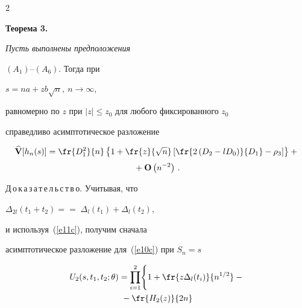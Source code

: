 \begin{multicols}{2}
\noindent


{\bf Теорема 3.} {\it  Пусть выполнены предположения


  $(A_1)\mbox{--}(A_6)$. Тогда при 


$s=na+z b\sqrt{n},~n\rightarrow\infty$,


равномерно по $z$ при $|z|\le z_0$ для любого фиксированного $z_0$


  справедливо асимптотическое разложение


  \begin{multline*} 


\widehat{\bf {V}}[h_n(s)]=\fr{D_1^2}{n}


     \left\{1+\fr{z}{\sqrt{n}}


     \left[ \fr{2\left(D_2-lD_0 \right)}{D_1}-\rho_3\right]


      \right\}+{}\\[3pt]


      {}+{\bf O}\left(n^{-2}\right)\,.


  \end{multline*}


   }





\smallskip








\noindent


Д\,о\,к\,а\,з\,а\,т\,е\,л\,ь\,с\,т\,в\,о. Учитывая, что


  $ \Delta_{2l}(t_1+t_2)=$\linebreak $=\;\Delta_l(t_1)+\Delta_l(t_2),$


  и используя~(\ref{e11c}), получим сначала


  асимптотическое разложение для~(\ref{e10c}) при $S_n=s$





  \pagebreak


  


\noindent


   \begin{multline*} 


U_2(s,t_1,t_2;\theta)=\prod_{i=1}^2 \Biggl\{


     1+\fr{z \Delta_l(t_i)}{n^{1/2}}-{}\\


     {}-\fr{H_2(z)}{2n}



\end{multline*}
\end{multicols}
